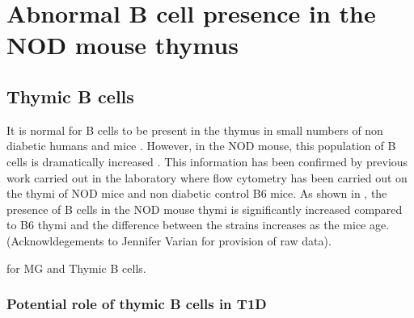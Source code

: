 \section{Abnormal B cell presence in the NOD mouse thymus}
\subsection{Thymic B cells}

It is normal for B cells to be present in the thymus in small numbers \citep{Isaacson1987, Akashi2000} of non diabetic humans \citep{Isaacson1987} and mice \citep{Akashi2000}. 
However, in the NOD mouse, this population of B cells is dramatically increased \citep{OReilly1994}.
This information has been confirmed by previous work carried out in the laboratory where flow cytometry has been carried out on the thymi of NOD mice and non diabetic control B6 mice.
As shown in , the presence of B cells in the NOD mouse thymi is significantly increased compared to B6 thymi and the difference between the strains increases as the mice age. (Acknowldegements to Jennifer Varian for provision of raw data). 

  \citep{Christensson1998} for MG and Thymic B cells.

\subsubsection{Potential role of thymic B cells in T1D}


































